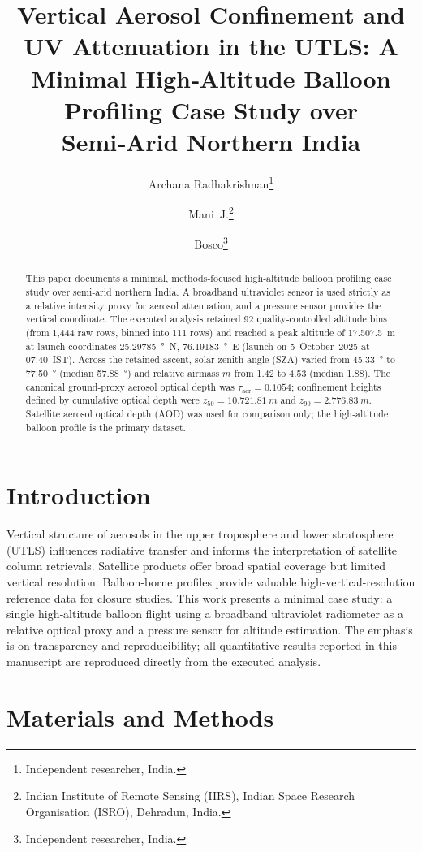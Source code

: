 \documentclass[11pt]{article}
\title{Vertical Aerosol Confinement and UV Attenuation in the UTLS: A Minimal High‑Altitude Balloon Profiling Case Study over Semi‑Arid Northern India}
\author{Archana Radhakrishnan\thanks{Independent researcher, India.\email{anju.archana@gmail.com}} \and Mani~J.\thanks{Indian Institute of Remote Sensing (IIRS), Indian Space Research Organisation (ISRO), Dehradun, India.\email{mani.joe.thoppil@gmail.com}} \and Bosco\thanks{Independent researcher, India.\email{bosco8b4824@gmail.com}}}
\date{}
\begin{document}
\maketitle

\begin{abstract}
This paper documents a minimal, methods‑focused high‑altitude balloon profiling case study over semi‑arid northern India.  A broadband ultraviolet sensor is used strictly as a relative intensity proxy for aerosol attenuation, and a pressure sensor provides the vertical coordinate.  The executed analysis retained 92 quality‑controlled altitude bins (from 1,444 raw rows, binned into 111 rows) and reached a peak altitude of \SI{17,507.5}{m} at launch coordinates \SI{25.29785}{\degree}~N, \SI{76.19183}{\degree}~E (launch on 5~October~2025 at 07:40~IST).  Across the retained ascent, solar zenith angle (SZA) varied from \SI{45.33}{\degree} to \SI{77.50}{\degree} (median \SI{57.88}{\degree}) and relative airmass $m$ from 1.42 to 4.53 (median 1.88).  The canonical ground‑proxy aerosol optical depth was $\tau_{\mathrm{aer}}=0.1054$; confinement heights defined by cumulative optical depth were $z_{50}=\SI{10,721.81}{m}$ and $z_{90}=\SI{2,776.83}{m}$.  Satellite aerosol optical depth (AOD) was used for comparison only; the high‑altitude balloon profile is the primary dataset.
\end{abstract}

\section{Introduction}
Vertical structure of aerosols in the upper troposphere and lower stratosphere (UTLS) influences radiative transfer and informs the interpretation of satellite column retrievals.  Satellite products offer broad spatial coverage but limited vertical resolution.  Balloon‑borne profiles provide valuable high‑vertical‑resolution reference data for closure studies.  This work presents a minimal case study: a single high‑altitude balloon flight using a broadband ultraviolet radiometer as a relative optical proxy and a pressure sensor for altitude estimation.  The emphasis is on transparency and reproducibility; all quantitative results reported in this manuscript are reproduced directly from the executed analysis.

\section{Materials and Methods}
\end{document}
